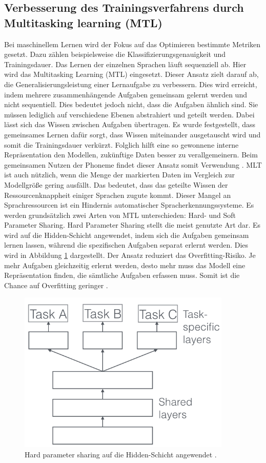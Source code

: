 \subsection{Verbesserung des Trainingsverfahrens durch Multitasking learning (MTL)}
 Bei maschinellem Lernen wird der Fokus auf das Optimieren bestimmte Metriken gesetzt. Dazu zählen beispielsweise die Klassifizierungsgenauigkeit und Trainingsdauer. Das Lernen der einzelnen Sprachen läuft sequenziell ab. Hier wird das Multitasking Learning (MTL) eingesetzt. Dieser Ansatz zielt darauf ab, die Generalisierungsleistung einer Lernaufgabe zu verbessern. Dies wird erreicht, indem mehrere zusammenhängende Aufgaben gemeinsam gelernt werden und nicht sequentiell. Dies bedeutet jedoch nicht, dass die Aufgaben ähnlich sind. Sie müssen lediglich auf verschiedene Ebenen abstrahiert und geteilt werden. Dabei lässt sich das Wissen zwischen Aufgaben übertragen. Es wurde festgestellt, dass gemeinsames Lernen dafür sorgt, dass Wissen miteinander ausgetauscht wird und somit die Trainingsdauer verkürzt. Folglich hilft eine so gewonnene interne Repräsentation den Modellen, zukünftige Daten besser zu verallgemeinern. Beim gemeinsamen Nutzen der Phoneme findet dieser Ansatz somit Verwendung {\cite{multitask}}. MLT ist auch nützlich, wenn die Menge der markierten Daten im Vergleich zur Modellgröße gering ausfällt. Das bedeutet, dass das geteilte Wissen der Ressourcenknappheit einiger Sprachen zugute kommt. Dieser Mangel an Sprachressourcen ist ein Hindernis automatischer Spracherkennungssysteme. Es werden grundsätzlich zwei Arten von MTL unterschieden: Hard- und Soft Parameter Sharing.\newline\newline
 Hard Parameter Sharing stellt die meist genutzte Art dar\cite{Ruder.2017}. Es wird auf die Hidden-Schicht angewendet, indem sich die Aufgaben gemeinsam lernen lassen, während die spezifischen Aufgaben separat erlernt werden. Dies wird in Abbildung \ref{fig:hard} dargestellt. Der Ansatz reduziert das Overfitting-Risiko. Je mehr Aufgaben gleichzeitig erlernt werden, desto mehr muss das Modell eine Repräsentation finden, die sämtliche Aufgaben erfassen muss. Somit ist die Chance auf Overfitting geringer \cite{Ruder.2017} \cite{Lu_multitasklearning}.
  \begin{figure}[h!]
 	\centering
 	\includegraphics[width=0.8\linewidth]{images/hard}
 	\caption{Hard parameter sharing auf die Hidden-Schicht angewendet \cite{Kulbear.2017}.} %
 	\label{fig:hard}
 \end{figure}

